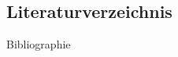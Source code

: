 
\subsection{Literaturverzeichnis}
\begin{frame}[allowframebreaks]{Bibliographie}
    \printbibliography
\end{frame}